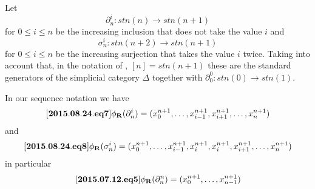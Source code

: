 \documentclass[11pt]{article}
\newenvironment{eq}{\begin{equation}}{\end{equation}}
\newcommand{\llabel}[1]{\label{#1}[{\bf #1}]}
\newcommand{\sr}{\rightarrow}
\newcommand{\rr}{{\bf R}}
\begin{document}
Let 
%
$$\partial^{i}_{n}:stn(n)\sr stn(n+1)$$
%
for $0\le i\le n$ be the increasing inclusion that does not take the value $i$ and
%
$$\sigma^{i}_{n}:stn(n+2)\sr stn(n+1)$$
%
for $0\le i\le n$ be the increasing surjection that takes the value $i$ twice. Taking into account that, in the notation of \cite{GabZis}, $[n]=stn(n+1)$ these are the standard generators of the simplicial category $\Delta$ together with $\partial^0_0:stn(0)\sr stn(1)$. 

In our sequence notation we have
%
\begin{eq}\llabel{2015.08.24.eq7}
\phi_{\rr}(\partial^{i}_{n})=(x_0^{n+1},\dots,x_{i-1}^{n+1},x_{i+1}^{n+1},\dots,x_n^{n+1})
\end{eq}
%
and
%
\begin{eq}\llabel{2015.08.24.eq8}
\phi_{\rr}(\sigma^{i}_{n})=(x_0^{n+1},\dots,x_{i-1}^{n+1},x_i^{n+1},x_i^{n+1},x_{i+1}^{n+1},\dots,x_n^{n+1})
\end{eq}
%
in particular
%
\begin{eq}\llabel{2015.07.12.eq5}
\phi_{\rr}(\partial^{n}_n)=(x_0^{n+1},\dots,x_{n-1}^{n+1})
\end{eq}
%
\end{document}
